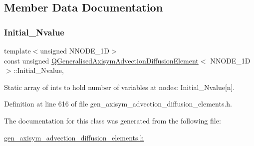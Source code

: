\subsection{Member Data Documentation}
\mbox{\label{classQGeneralisedAxisymAdvectionDiffusionElement_a56731006b4970e2a38efa586df3190ac}} 
\subsubsection{\texorpdfstring{Initial\+\_\+\+Nvalue}{Initial\_Nvalue}}
{\footnotesize\ttfamily template$<$unsigned N\+N\+O\+D\+E\+\_\+1D$>$ \\
const unsigned \hyperlink{classQGeneralisedAxisymAdvectionDiffusionElement}{Q\+Generalised\+Axisym\+Advection\+Diffusion\+Element}$<$ N\+N\+O\+D\+E\+\_\+1D $>$\+::Initial\+\_\+\+Nvalue\hspace{0.3cm}{\ttfamily [static]}, {\ttfamily [private]}}



Static array of ints to hold number of variables at nodes\+: Initial\+\_\+\+Nvalue\mbox{[}n\mbox{]}. 



Definition at line 616 of file gen\+\_\+axisym\+\_\+advection\+\_\+diffusion\+\_\+elements.\+h.



The documentation for this class was generated from the following file\+:\begin{DoxyCompactItemize}
\item 
\hyperlink{gen__axisym__advection__diffusion__elements_8h}{gen\+\_\+axisym\+\_\+advection\+\_\+diffusion\+\_\+elements.\+h}\end{DoxyCompactItemize}
